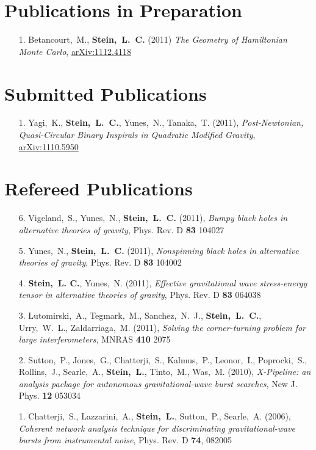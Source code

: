 \section{\sc Publications in Preparation}
\begin{enumerate}
\item[{1.}] Betancourt,~M., {\bf Stein,~L.~C.} (2011) {\it The
    Geometry of Hamiltonian Monte Carlo}, \href{http://arxiv.org/abs/1112.4118}{arXiv:1112.4118}
\end{enumerate}

\section{\sc Submitted Publications}
\begin{enumerate}
\item[{1.}] Yagi,~K., {\bf Stein,~L.~C.}, Yunes,~N.,
  Tanaka,~T. (2011), {\it Post-Newtonian, Quasi-Circular Binary
    Inspirals in Quadratic Modified Gravity}, \href{http://arxiv.org/abs/1110.5950}{arXiv:1110.5950}
\end{enumerate}

\section{\sc Refereed Publications}
\begin{enumerate}
\item[{6.}] Vigeland,~S., Yunes,~N., {\bf Stein,~L.~C.} (2011), {\it
    Bumpy black holes in alternative theories of gravity},
  Phys. Rev. D {\bf 83} 104027
\item[{5.}] Yunes,~N., {\bf Stein,~L.~C.} (2011), {\it Nonspinning
    black holes in alternative theories of gravity},
  Phys. Rev. D {\bf 83} 104002
\item[{4.}] {\bf Stein,~L. C.}, Yunes,~N. (2011), {\it Effective
    gravitational wave stress-energy tensor in alternative theories of
    gravity}, Phys. Rev. D {\bf 83} 064038
\item[{3.}] Lutomirski,~A., Tegmark,~M., Sanchez,~N.~J., {\bf
    Stein,~L.~C.},
  Urry,~W.~L., Zaldarriaga,~M. (2011), {\it Solving the
    corner-turning problem for large interferometers}, MNRAS {\bf 410} 2075
\item[{2.}] Sutton,~P., Jones,~G., Chatterji,~S., Kalmus,~P., Leonor,~I.,
  Poprocki,~S., Rollins,~J., Searle,~A., {\bf Stein,~L.}, Tinto,~M.,
  Was,~M. (2010), {\it X-Pipeline: an analysis package for autonomous
    gravitational-wave burst searches}, New J. Phys. {\bf 12} 053034
\item[{1.}] Chatterji,~S., Lazzarini,~A., {\bf Stein,~L.}, Sutton,~P.,
  Searle,~A. (2006), {\it Coherent network analysis technique for
    discriminating gravitational-wave bursts from instrumental noise},
  Phys. Rev. D {\bf 74}, 082005
\end{enumerate}

